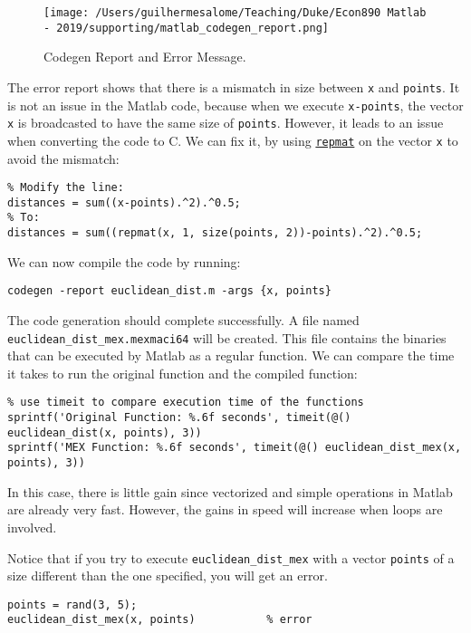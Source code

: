 \documentclass[12pt, a4paper]{article}
\begin{document}
\begin{figure}[H]
\centering
\texttt{[image: /Users/guilhermesalome/Teaching/Duke/Econ890 Matlab - 2019/supporting/matlab\_codegen\_report.png]}
\caption{\label{fig:org32c0117}
Codegen Report and Error Message.}
\end{figure}

The error report shows that there is a mismatch in size between \texttt{x} and \texttt{points}.
It is not an issue in the Matlab code, because when we execute \texttt{x-points}, the vector \texttt{x} is broadcasted to have the same size of \texttt{points}.
However, it leads to an issue when converting the code to C.
We can fix it, by using \href{https://www.mathworks.com/help/matlab/ref/repmat.html?s\_tid=doc\_ta}{\texttt{repmat}} on the vector \texttt{x} to avoid the mismatch:
\lstset{language=matlab,label= ,caption= ,captionpos=b,firstnumber=1,numbers=left,style=Matlab-editor}
\begin{lstlisting}
% Modify the line:
distances = sum((x-points).^2).^0.5;
% To:
distances = sum((repmat(x, 1, size(points, 2))-points).^2).^0.5;
\end{lstlisting}

We can now compile the code by running:
\lstset{language=matlab,label= ,caption= ,captionpos=b,firstnumber=1,numbers=left,style=Matlab-editor}
\begin{lstlisting}
codegen -report euclidean_dist.m -args {x, points}
\end{lstlisting}

The code generation should complete successfully.
A file named \texttt{euclidean\_dist\_mex.mexmaci64} will be created.
This file contains the binaries that can be executed by Matlab as a regular function.
We can compare the time it takes to run the original function and the compiled function:
\lstset{language=matlab,label= ,caption= ,captionpos=b,firstnumber=1,numbers=left,style=Matlab-editor}
\begin{lstlisting}
% use timeit to compare execution time of the functions
sprintf('Original Function: %.6f seconds', timeit(@() euclidean_dist(x, points), 3))
sprintf('MEX Function: %.6f seconds', timeit(@() euclidean_dist_mex(x, points), 3))
\end{lstlisting}

In this case, there is little gain since vectorized and simple operations in Matlab are already very fast.
However, the gains in speed will increase when loops are involved.

Notice that if you try to execute \texttt{euclidean\_dist\_mex} with a vector \texttt{points} of a size different than the one specified, you will get an error.
\lstset{language=matlab,label= ,caption= ,captionpos=b,firstnumber=1,numbers=left,style=Matlab-editor}
\begin{lstlisting}
points = rand(3, 5);
euclidean_dist_mex(x, points)           % error
\end{lstlisting}
\end{document}

